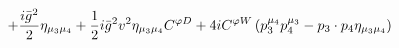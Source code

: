 %
\begin{dmath*}
%
  +  \frac{i {\bar g}{}^2}{2}\eta_{\mu_3 \mu_4}  +  \frac{1}{2} i {\bar g}{}^2 v^2\eta_{\mu_3 \mu_4} C^{ \varphi  D}  +  4 iC^{ \varphi  W} \left(p_3^{\mu_4} p_4^{\mu_3} - p_{3}\nobreak\cdot\nobreak{}p_{4} \eta_{\mu_3 \mu_4}\right)
%
\end{dmath*}
%
